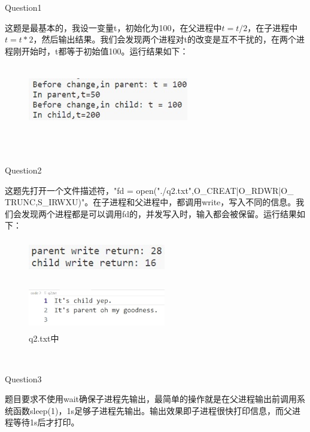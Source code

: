\documentclass[12pt]{article}
\begin{document}
\begin{large}
    \noindent Question1\\
\end{large}
\hspace*{2em}这题是最基本的，我设一变量t，初始化为100，在父进程中$t=t/2$，在子进程中$t=t*2$，然后输出结果。我们会发现两个进程对t的改变是互不干扰的，在两个进程刚开始时，t都等于初始值100。运行结果如下：
\begin{figure}[h]
    \centering
    \includegraphics*[height=3cm,width=7cm]{HW2-8.jpg}
\end{figure}\\
\begin{large}
    \noindent Question2\\
\end{large}
\hspace*{2em}这题先打开一个文件描述符，"fd = open("./q2.txt",O\_CREAT|O\_RDWR|O\_\\TRUNC,S\_IRWXU)"。在子进程和父进程中，都调用write，写入不同的信息。我们会发现两个进程都是可以调用fd的，并发写入时，输入都会被保留。运行结果如下：
\begin{figure}[h]
    \centering
    \includegraphics*[height=1.5cm,width=6cm]{HW2-9.jpg}
\end{figure}
\begin{figure}[h]
    \centering
    \includegraphics*[height=2cm,width=6cm]{HW2-10.jpg}
    \caption*{q2.txt中}
\end{figure}\\
\begin{large}
    \noindent Question3\\
\end{large}
\hspace*{2em}题目要求不使用wait确保子进程先输出，最简单的操作就是在父进程输出前调用系统函数sleep(1)，1s足够子进程先输出。输出效果即子进程很快打印信息，而父进程等待1s后才打印。
\end{document}
